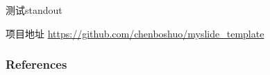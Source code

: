 \documentclass[slide]{myslide} %
\begin{document}
\begin{frame}[standout]
	测试standout
\end{frame}

\begin{frame}{项目地址}
	\url{https://github.com/chenboshuo/myslide_template}
\end{frame}

	\begin{frame}[allowframebreaks]
	\frametitle{References}
		\nocite{*}
		\printbibliography
	\end{frame}
\end{document}
